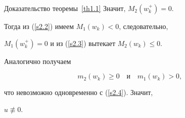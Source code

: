 \begin{pf*}{Доказательство теоремы~\ref{th1.1}}
Значит, $M_2(w_k^+)=0$.


Тогда из (\ref{s2.2}) имеем $M_1(w_k)<0$, следовательно,


$M_1(w_k^+)=0$ и из (\ref{s2.3}) вытекает $M_2(w_k)\leq0$.


Аналогично получаем


$$


m_2(w_k)\geq 0\quad \text{и} \quad m_1(w_k)>0,


$$


что невозможно одновременно с (\ref{s2.4}). Значит,


$u\not\equiv0$.


\end{pf*}








